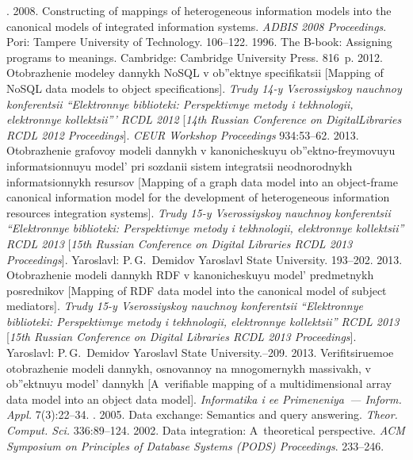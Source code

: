 \begin{multicols}{2}
{{\begin{thebibliography}{99}
. 2008. Constructing of mappings of
heterogeneous information models into the canonical models of integrated information
systems. \textit{ADBIS 2008 Proceedings}. Pori: Tampere University of Technology.
106--122.
 1996. The B-book: Assigning programs to meanings. Cambridge:
Cambridge University Press. 816~p.
 2012. Otobrazhenie modeley dannykh NoSQL v ob''ektnye
specifikatsii [Mapping of NoSQL data models to object specifications]. \textit{Trudy 14-y\linebreak
Vserossiyskoy nauchnoy konferentsii ``Elektronnye biblioteki: Perspektivnye metody i
tekhnologii, elektronnye kollektsii''' RCDL 2012} [\textit{14th Russian Conference on
Digital\linebreak \mbox{Libraries} RCDL 2012 Proceedings}]. \textit{CEUR Workshop Proceedings}
934:53--62.
 2013. Otobrazhenie grafovoy modeli dannykh v kanonicheskuyu
ob''ektno-freymovuyu informa\-tsi\-on\-nuyu model' pri sozdanii sistem integratsii neodnorodnykh
informatsionnykh resursov [Mapping of a graph data model into an object-frame canonical
information model for the development of heterogeneous information resources integration
systems]. \textit{Trudy 15-y Vserossiyskoy nauchnoy konferentsii ``Elektronnye biblioteki:
Perspektivnye metody i tekhnologii, elektronnye kollektsii'' RCDL 2013} [\textit{15th
Russian Conference on Digital Libraries RCDL 2013 Proceedings}]. Yaroslavl:
P.\,G.~Demidov Yaroslavl State University. 193--202.
 2013. Otobrazhenie modeli dannykh RDF v kanonicheskuyu model'
predmetnykh posrednikov [Mapping of RDF data model into the canonical model of subject
mediators]. \textit{Trudy 15-y Vserossiyskoy nauchnoy konferentsii ``Elektronnye biblioteki:
Perspektivnye metody i tekhnologii, elektronnye kollektsii'' RCDL 2013} [\textit{15th
Russian Conference on Digital Libraries RCDL 2013 Proceedings}]. Yaroslavl:
P.\,G.~Demidov Yaroslavl State University.--209.
 2013. Verifitsiruemoe otobrazhenie mo\-de\-li dannykh, osnovannoy na
mnogomernykh massivakh, v ob''ektnuyu model' dannykh [A~verifiable mapping of a
multidimensional array data model into an object data model].
\textit{Informatika i ee Primeneniya~--- Inform. Appl.} 7(3):22--34.
. 2005. Data exchange:
Semantics and query answering. \textit{Theor. Comput. Sci.} 336:89--124.
 2002. Data integration: A~theoretical perspective. \textit{ACM
Symposium on Principles of Database Systems (PODS) Proceedings}. 233--246.


\end{thebibliography}}}
\end{multicols}
